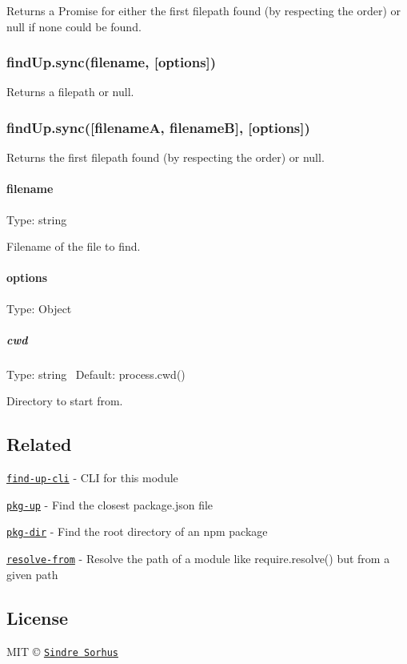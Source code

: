 Returns a {\ttfamily Promise} for either the first filepath found (by respecting the order) or {\ttfamily null} if none could be found.

\subsubsection*{find\+Up.\+sync(filename, \mbox{[}options\mbox{]})}

Returns a filepath or {\ttfamily null}.

\subsubsection*{find\+Up.\+sync(\mbox{[}filename\+A, filename\+B\mbox{]}, \mbox{[}options\mbox{]})}

Returns the first filepath found (by respecting the order) or {\ttfamily null}.

\paragraph*{filename}

Type\+: {\ttfamily string}

Filename of the file to find.

\paragraph*{options}

Type\+: {\ttfamily Object}

\subparagraph*{cwd}

Type\+: {\ttfamily string}~\newline
 Default\+: {\ttfamily process.\+cwd()}

Directory to start from.

\subsection*{Related}


\begin{DoxyItemize}
\item \href{https://github.com/sindresorhus/find-up-cli}{\tt find-\/up-\/cli} -\/ C\+LI for this module
\item \href{https://github.com/sindresorhus/pkg-up}{\tt pkg-\/up} -\/ Find the closest package.\+json file
\item \href{https://github.com/sindresorhus/pkg-dir}{\tt pkg-\/dir} -\/ Find the root directory of an npm package
\item \href{https://github.com/sindresorhus/resolve-from}{\tt resolve-\/from} -\/ Resolve the path of a module like {\ttfamily require.\+resolve()} but from a given path
\end{DoxyItemize}

\subsection*{License}

M\+IT © \href{https://sindresorhus.com}{\tt Sindre Sorhus} 